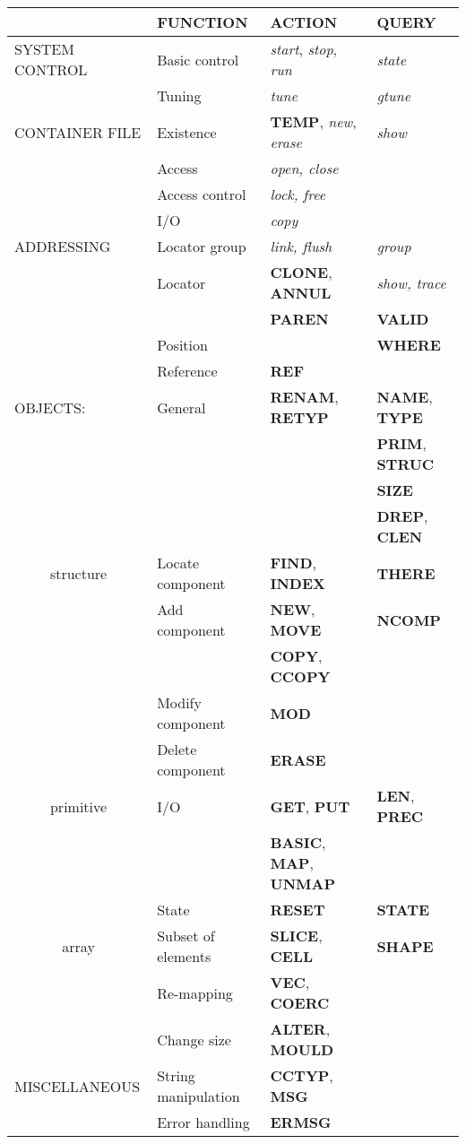 \begin{center}
\begin{tabular}{|l|l|l|l|} \hline
& FUNCTION & ACTION & QUERY\\ \hline
SYSTEM CONTROL & Basic control & {\em start}, {\em stop}, {\em run} & {\em state} \\
& Tuning & {\em tune} & {\em gtune} \\
\hline
CONTAINER FILE & Existence & {\bf TEMP}, {\em new}, {\em erase} & {\em show} \\
& Access & {\em open, close} & \\
& Access control & {\em lock, free} & \\
& I/O & {\em copy} & \\
\hline
ADDRESSING & Locator group & {\em link, flush} & {\em group} \\
& Locator & {\bf CLONE}, {\bf ANNUL} & {\em show, trace} \\
& & {\bf PAREN} & {\bf VALID} \\
& Position & & {\bf WHERE} \\
& Reference & {\bf REF} & \\
\hline
OBJECTS: & General & {\bf RENAM}, {\bf RETYP} & {\bf NAME}, {\bf TYPE} \\
& & & {\bf PRIM}, {\bf STRUC} \\
& & & {\bf SIZE} \\
& & & {\bf DREP}, {\bf CLEN} \\
\hline
\multicolumn{1}{|c|}{structure}
& Locate component & {\bf FIND}, {\bf INDEX} & {\bf THERE} \\
& Add component & {\bf NEW}, {\bf MOVE} & {\bf NCOMP} \\
& & {\bf COPY}, {\bf CCOPY} & \\
& Modify component & {\bf MOD} & \\
& Delete component & {\bf ERASE} & \\
\hline
\multicolumn{1}{|c|}{primitive}
& I/O & {\bf GET}, {\bf PUT} & {\bf LEN}, {\bf PREC} \\
& & {\bf BASIC}, {\bf MAP}, {\bf UNMAP} & \\
& State & {\bf RESET} & {\bf STATE} \\
\hline
\multicolumn{1}{|c|}{array}
& Subset of elements & {\bf SLICE}, {\bf CELL} & {\bf SHAPE} \\
& Re-mapping & {\bf VEC}, {\bf COERC} & \\
& Change size & {\bf ALTER}, {\bf MOULD} & \\
\hline
MISCELLANEOUS & String manipulation & {\bf CCTYP}, {\bf MSG} & \\
& Error handling & {\bf ERMSG} & \\
\hline
\end{tabular}
\label{R_Anal}
\end{center}

